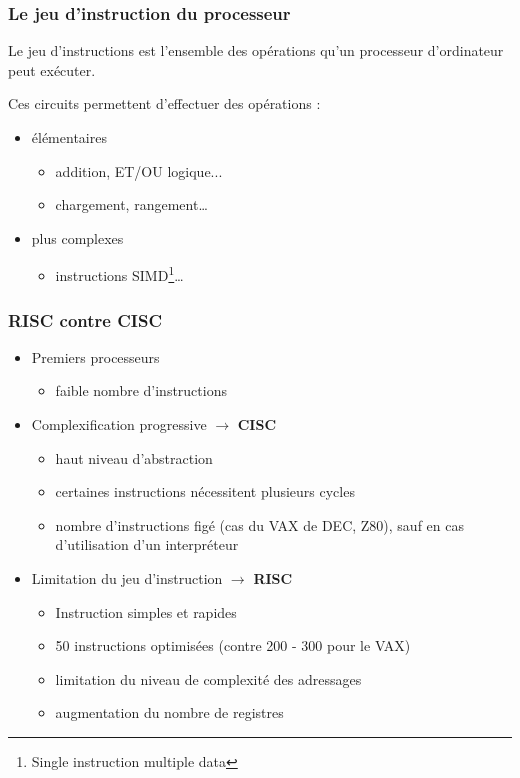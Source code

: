 \begin{frame}
\frametitle{Le jeu d'instruction du processeur}
\begin{definition}
Le jeu d'instructions est l'ensemble des opérations qu'un processeur d'ordinateur peut exécuter.  \cite{wp-ji}

Ces circuits permettent d'effectuer des opérations :
\begin{itemize}
\item élémentaires
\begin{itemize}
\item addition, ET/OU logique...
\item chargement, rangement…
\end{itemize}

\item plus complexes\begin{itemize}
\item instructions SIMD\footnote{Single instruction multiple data}…
\end{itemize}
\end{itemize}
\end{definition}

\end{frame}

\begin{frame}
\frametitle{RISC contre CISC}
\begin{itemize}
\item Premiers processeurs
\begin{itemize}
\item faible nombre d'instructions
\end{itemize}
\item Complexification progressive $\rightarrow$ \textbf{CISC}
\begin{itemize}
\item haut niveau d'abstraction
\item certaines instructions nécessitent plusieurs cycles
\item nombre d'instructions figé (cas du VAX de DEC, Z80), sauf en cas d'utilisation d'un interpréteur
\end{itemize}
\item Limitation du jeu d'instruction $\rightarrow$ \textbf{RISC}
\begin{itemize}
\item Instruction simples et rapides
\item 50 instructions optimisées (contre 200 - 300 pour le VAX)
\item limitation du niveau de complexité des adressages
\item augmentation du nombre de registres
\end{itemize}
\end{itemize}
\end{frame}

